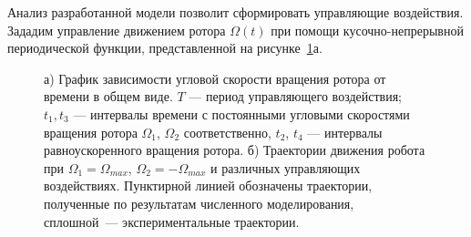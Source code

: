 Анализ разработанной модели позволит сформировать управляющие воздействия. Зададим управление движением ротора $\Omega(t)$  при помощи кусочно-непрерывной периодической функции, представленной на рисунке~\ref{ControlAction}а.


\begin{figure}[!ht]
	\begin{minipage}[h]{0.3\linewidth}
	\end{minipage}
	\hfill
	\begin{minipage}[h]{0.7\linewidth}
	\end{minipage}
	\vfill
	\begin{minipage}[h]{0.3\linewidth}
	\end{minipage}
	\hfill
	\begin{minipage}[h]{0.7\linewidth}
	\end{minipage}
	\caption{а) График зависимости угловой скорости вращения ротора от времени в общем виде. $T$ --- период управляющего воздействия; $t_1, t_3$ --- интервалы времени с постоянными угловыми скоростями вращения ротора $\Omega_1$, $\Omega_2$ соответственно, $t_2$, $t_4$ --- интервалы равноускоренного вращения ротора. б) Траектории движения робота при  $ \Omega_1 = \Omega_{max} $, $ \Omega_2 = -\Omega_{max} $ и различных  управляющих воздействиях. Пунктирной линией обозначены траектории, полученные по результатам численного моделирования, сплошной~--- экспериментальные траектории.}
	\label{ControlAction}
\end{figure}

